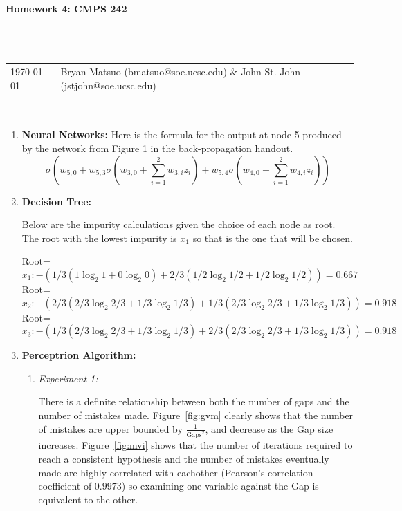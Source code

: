 \documentclass[12pt]{article}
\renewcommand{\title}[1]{\textbf{#1}\\}
\renewcommand{\line}{\begin{tabularx}{\textwidth}{X>{\raggedleft}X}\hline\\\end{tabularx}\\[-0.5cm]}
\newcommand{\leftright}[2]{\begin{tabularx}{\textwidth}{X>{\raggedleft}X}#1%
& #2\\\end{tabularx}\\[-0.5cm]}
\begin{document}
\title{Homework 4: CMPS 242}
\line
\leftright{\today}{Bryan Matsuo (bmatsuo@soe.ucsc.edu) \& John St. John (jstjohn@soe.ucsc.edu)} %
\begin{enumerate}
\item \textbf{Neural Networks:}
Here is the formula for the output at node 5 produced by the network from Figure 1 in the back-propagation handout.
\[
\sigma\left(w_{5,0}+w_{5,3}\sigma\left(w_{3,0}+\sum_{i=1}^2w_{3,i}z_i\right)+w_{5,4}\sigma\left(w_{4,0}+\sum_{i=1}^2w_{4,i}z_i\right) \right)
\]

\item \textbf{Decision Tree:}

Below are the impurity calculations given the choice of each node as root. The root with the lowest impurity is $x_1$ so that is the one that will be chosen.

Root=\[x_1: -\left(1/3\left(1\log_2 1 + 0\log_2 0 \right)+ 2/3 \left( 1/2\log_2 1/2 + 1/2\log_2 1/2\right)\right) = 0.667\]
Root=\[x_2: -\left(2/3\left( 2/3\log_2 2/3 + 1/3\log_2 1/3 \right) + 1/3 \left( 2/3\log_2 2/3 + 1/3\log_2 1/3 \right) \right)= 0.918 \]
Root=\[x_3: -\left(1/3\left( 2/3\log_2 2/3 + 1/3\log_2 1/3\right) + 2/3 \left( 2/3\log_2 2/3 + 1/3\log_2 1/3 \right)\right) =  0.918 \]


\item \textbf{Perceptrion Algorithm:}

\begin{enumerate}
\item \textit{Experiment 1:}

There is a definite relationship between both the number of gaps and the number of mistakes made. Figure~\ref{fig:gvm} clearly shows that the number of mistakes are upper bounded by $\frac{1}{\text{Gaps}^2}$, and decrease as the Gap size increases. Figure~\ref{fig:mvi} shows that the number of iterations required to reach a consistent hypothesis and the number of mistakes eventually made are highly correlated with eachother (Pearson's correlation coefficient of $0.9973$) so examining one variable against the Gap is equivalent to the other.



\end{enumerate}
\end{enumerate}
\end{document}

